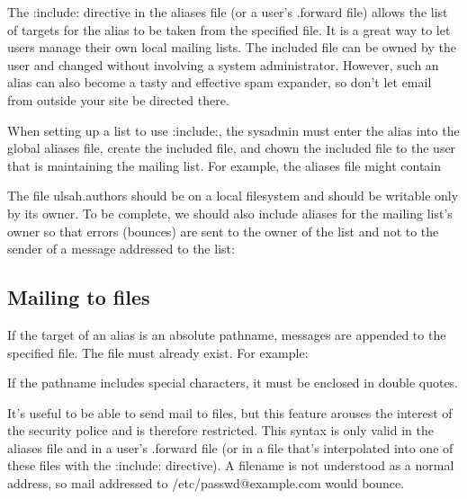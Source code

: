 The {:include:} directive in the {aliases} file (or a user's {.forward}
file) allows the list of
\protect\hypertarget{part0026_split_019.htmlux5cux23_idIndexMarker2477}{}{}targets
for the alias to be taken from the specified file. It is a great way to
let users manage their own local mailing lists. The included file can be
owned by the user and changed without involving a system administrator.
However, such an alias can also become a tasty and effective spam
expander, so don't let email from outside your site be directed there.

When setting up a list to use {:include:}, the sysadmin must enter the
alias into the global {aliases} file, create the included file, and
{chown} the included file to the user that is maintaining the mailing
list. For example, the {aliases} file might contain


The file {ulsah.authors} should be on a local filesystem and should be
writable only by its owner. To be complete, we should also include
aliases for the mailing list's owner so that errors (bounces) are sent
to the owner of the list and not to the sender of a message addressed to
the list:


\protect\hypertarget{part0026_split_020.html}{}{}

\hypertarget{part0026_split_020.htmlux5cux23_idContainer1247}{}
\hypertarget{part0026_split_020.htmlux5cux23calibre_pb_19}{%
\subsection[Mailing to
files]{\texorpdfstring{\protect\hypertarget{part0026_split_020.htmlux5cux23_idTextAnchor1033}{}{}Mailing
to
files}{Mailing to files}}\label{part0026_split_020.htmlux5cux23calibre_pb_19}}

\protect\hypertarget{part0026_split_020.htmlux5cux23_idIndexMarker2478}{}{}If
the target of an alias is an absolute pathname, messages are appended to
the specified file. The file must already exist. For example:


If the pathname includes special characters, it must be enclosed in
double quotes.

It's useful to be able to send mail to files, but this feature arouses
the interest of the security police and is therefore restricted. This
syntax is only valid in the {aliases} file and in a user's {.forward}
file (or in a file that's interpolated into one of these files with the
{:include:} directive). A filename is not understood as a normal
address, so mail addressed to /etc/passwd@example.com would bounce.

